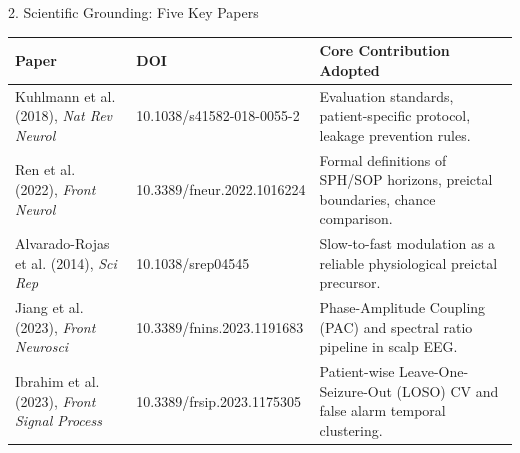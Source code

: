 \documentclass[aspectratio=169,10pt]{beamer}
\begin{document}
\begin{frame}{2. Scientific Grounding: Five Key Papers}
\small
\begin{table}
\centering
\begin{tabular}{p{2.8cm}p{3.2cm}p{6.8cm}}
\toprule
\textbf{Paper} & \textbf{DOI} & \textbf{Core Contribution Adopted} \\
\midrule
Kuhlmann et al. (2018), \emph{Nat Rev Neurol} & 10.1038/s41582-018-0055-2 & Evaluation standards, patient-specific protocol, leakage prevention rules. \\
Ren et al. (2022), \emph{Front Neurol} & 10.3389/fneur.2022.1016224 & Formal definitions of SPH/SOP horizons, preictal boundaries, chance comparison. \\
Alvarado-Rojas et al. (2014), \emph{Sci Rep} & 10.1038/srep04545 & Slow-to-fast modulation as a reliable physiological preictal precursor. \\
Jiang et al. (2023), \emph{Front Neurosci} & 10.3389/fnins.2023.1191683 & Phase-Amplitude Coupling (PAC) and spectral ratio pipeline in scalp EEG. \\
Ibrahim et al. (2023), \emph{Front Signal Process} & 10.3389/frsip.2023.1175305 & Patient-wise Leave-One-Seizure-Out (LOSO) CV and false alarm temporal clustering. \\
\bottomrule
\end{tabular}
\end{table}
\end{frame}
\end{document}
